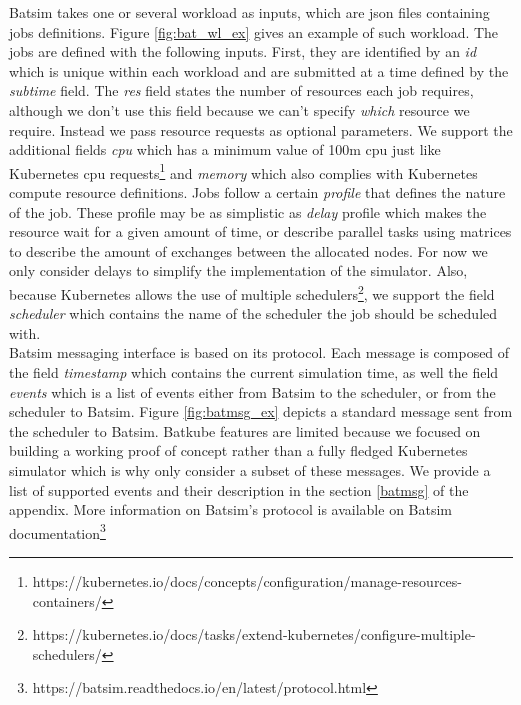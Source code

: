 Batsim takes one or several workload as inputs, which are json files containing
jobs definitions. Figure \ref{fig:bat_wl_ex} gives an example of such workload.
The jobs are defined with the following inputs.  First, they are identified by
an \textit{id} which is unique within each workload and are submitted at a time
defined by the \textit{subtime} field. The \textit{res} field states the number
of resources each job requires, although we don't use this field because we
can't specify \textit{which} resource we require. Instead we pass resource
requests as optional parameters. We support the additional fields \textit{cpu}
which has a minimum value of 100m cpu just like Kubernetes cpu
requests\footnote{https://kubernetes.io/docs/concepts/configuration/manage-resources-containers/}
and \textit{memory} which also complies with Kubernetes compute resource
definitions.  Jobs follow a certain \textit{profile} that defines the nature of
the job.  These profile may be as simplistic as \textit{delay} profile which
makes the resource wait for a given amount of time, or describe parallel tasks
using matrices to describe the amount of exchanges between the allocated nodes.
For now we only consider delays to simplify the implementation of the
simulator. Also, because Kubernetes allows the use of multiple
schedulers\footnote{https://kubernetes.io/docs/tasks/extend-kubernetes/configure-multiple-schedulers/},
we support the field \textit{scheduler} which contains the name of the
scheduler the job should be scheduled with.\\

Batsim messaging interface is based on its protocol. Each message is composed
of the field \textit{timestamp} which contains the current simulation time, as
well the field \textit{events} which is a list of events either from Batsim to
the scheduler, or from the scheduler to Batsim. Figure \ref{fig:batmsg_ex}
depicts a standard message sent from the scheduler to Batsim.  Batkube features
are limited because we focused on building a working proof of concept rather
than a fully fledged Kubernetes simulator which is why only consider a subset
of these messages. We provide a list of supported events and their description
in the section \ref{batmsg} of the appendix. More information on Batsim's
protocol is available on Batsim
documentation\footnote{https://batsim.readthedocs.io/en/latest/protocol.html}

